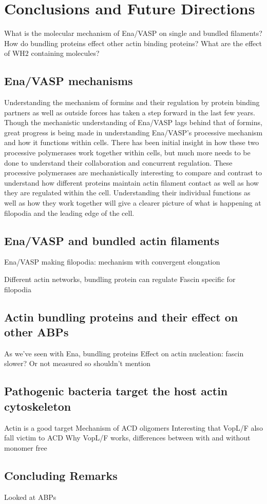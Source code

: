\chapter{Conclusions and Future Directions}\label{ch:conclusions}

What is the molecular mechanism of Ena/VASP on single and bundled filaments?
How do bundling proteins effect other actin binding proteins?
What are the effect of WH2 containing molecules?

\section{Ena/VASP mechanisms}\label{ena-mechanism-conclusions}
Understanding the mechanism of formins and their regulation by protein binding partners as well as outside forces has taken a step forward in the last few years. Though the mechanistic understanding of Ena/VASP lags behind that of formins, great progress is being made in understanding Ena/VASP's processive mechanism and how it functions within cells. There has been initial insight in how these two processive polymerases work together within cells, but much more needs to be done to understand their collaboration and concurrent regulation. These processive polymerases are mechanistically interesting to compare and contrast to understand how different proteins maintain actin filament contact as well as how they are regulated within the cell. Understanding their individual functions as well as how they work together will give a clearer picture of what is happening at filopodia and the leading edge of the cell. 

\section{Ena/VASP and bundled actin filaments}\label{ena-bundles-conclusions}
Ena/VASP making filopodia:
mechanism with convergent elongation

Different actin networks, bundling protein can regulate
Fascin specific for filopodia

\section{Actin bundling proteins and their effect on other ABPs}\label{bundler-conclusions}

As we've seen with Ena, bundling proteins 
Effect on actin nucleation: fascin slower? Or not measured so shouldn't mention

\section{Pathogenic bacteria target the host actin cytoskeleton}\label{bacteria-conclusions}
Actin is a good target
Mechanism of ACD oligomers
Interesting that VopL/F also fall victim to ACD
Why VopL/F works, differences between with and without monomer free

\section{Concluding Remarks}\label{final-conclusions}
Looked at ABPs